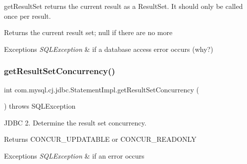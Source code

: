 get\+Result\+Set returns the current result as a Result\+Set. It should only be called once per result.

\begin{DoxyReturn}{Returns}
the current result set; null if there are no more
\end{DoxyReturn}

\begin{DoxyExceptions}{Exceptions}
{\em S\+Q\+L\+Exception} & if a database access error occurs (why?) \\
\hline
\end{DoxyExceptions}
\mbox{\label{classcom_1_1mysql_1_1cj_1_1jdbc_1_1_statement_impl_a4a5fa990b06601f984e4393d6cb02b26}} 
\subsubsection{\texorpdfstring{get\+Result\+Set\+Concurrency()}{getResultSetConcurrency()}}
{\footnotesize\ttfamily int com.\+mysql.\+cj.\+jdbc.\+Statement\+Impl.\+get\+Result\+Set\+Concurrency (\begin{DoxyParamCaption}{ }\end{DoxyParamCaption}) throws S\+Q\+L\+Exception}

J\+D\+BC 2. Determine the result set concurrency.

\begin{DoxyReturn}{Returns}
C\+O\+N\+C\+U\+R\+\_\+\+U\+P\+D\+A\+T\+A\+B\+LE or C\+O\+N\+C\+U\+R\+\_\+\+R\+E\+A\+D\+O\+N\+LY
\end{DoxyReturn}

\begin{DoxyExceptions}{Exceptions}
{\em S\+Q\+L\+Exception} & if an error occurs \\
\hline
\end{DoxyExceptions}
\mbox{\label{classcom_1_1mysql_1_1cj_1_1jdbc_1_1_statement_impl_a84b0f5b22d3ce2bd808aceb6c17e4620}} 

